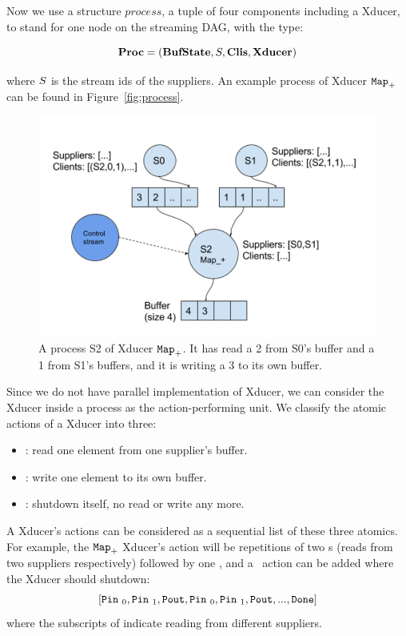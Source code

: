 Now we use a structure $process$, a tuple of four components including a Xducer, to stand for one node on the streaming DAG, with the type:

$$ \proc  =  (\bufst, \S, \clis, \xducer) $$

where $\S$ is the stream ids of the suppliers. An example process of Xducer $\map{+}$ can be found in Figure~\ref{fig:process}.

\begin{figure}
	\centering
	\includegraphics[width=1.0\textwidth]{process2}
	\caption{A process S2 of Xducer $\map{+}$. It has read a 2 from S0's buffer and a 1 from S1's buffers, and it is writing a 3 to its own buffer.}
	\label{fig:process2}
\end{figure}

Since we do not have parallel implementation of Xducer, we can consider the Xducer inside a process as the action-performing unit. 
We classify the atomic actions of a Xducer into three:
\begin{itemize}
	\item \pin: read one element from one supplier's buffer.
	\item \pout : write one element to its own buffer.
	\item \done: shutdown itself, no read or write any more.
\end{itemize}

A Xducer's actions can be considered as a sequential list of these three atomics.
For example,  the $\map{+}$ Xducer's action will be repetitions of two \pin s (reads from two suppliers respectively) followed by one \pout, and 
a \done \ action can be added where the Xducer should shutdown:
$$[\pin_0, \pin_1, \pout, \pin_0, \pin_1, \pout,... ,\done]$$
 where the subscripts of \pin indicate reading from different suppliers.


